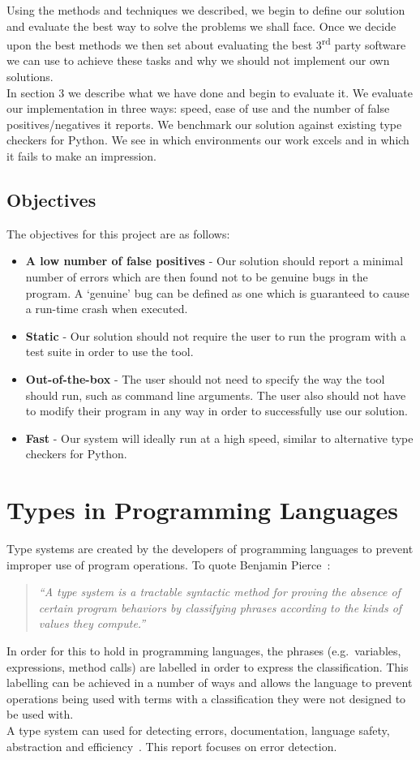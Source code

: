 \documentclass[12pt, titlepage]{article}
\begin{document}
\indent Using the methods and techniques we described, we begin to define our solution and evaluate the best way to solve the problems we shall face. Once we decide upon the best methods we then set about evaluating the best 3\textsuperscript{rd} party software we can use to achieve these tasks and why we should not implement our own solutions. \\
\indent In section 3 we describe what we have done and begin to evaluate it. We evaluate our implementation in three ways: speed, ease of use and the number of false positives/negatives it reports. We benchmark our solution against existing type checkers for Python. We see in which environments our work excels and in which it fails to make an impression.

\subsection{Objectives}
The objectives for this project are as follows:
\begin{itemize}
	\item \textbf{A low number of false positives} - Our solution should report a minimal number of errors which are then found not to be genuine bugs in the program. A `genuine' bug can be defined as one which is guaranteed to cause a run-time crash when executed.
	\item \textbf{Static} - Our solution should not require the user to run the program with a test suite in order to use the tool.
	\item \textbf{Out-of-the-box} - The user should not need to specify the way the tool should run, such as command line arguments. The user also should not have to modify their program in any way in order to successfully use our solution.
	\item \textbf{Fast} - Our system will ideally run at a high speed, similar to alternative type checkers for Python.
\end{itemize} 

\newpage
\section{Types in Programming Languages}
Type systems are created by the developers of programming languages to prevent improper use of program operations. To quote Benjamin Pierce~\cite{pierce02}:
\begin{quote}
	\emph{``A type system is a tractable syntactic method for proving the absence of certain program behaviors by classifying phrases according to the kinds of values they compute.''}
\end{quote}
In order for this to hold in programming languages, the phrases (e.g.\ variables, expressions, method calls) are labelled in order to express the classification. This labelling can be achieved in a number of ways and allows the language to prevent operations being used with terms with a classification they were not designed to be used with. \\
A type system can used for detecting errors, documentation, language safety, abstraction and efficiency~\cite{pierce02}. This report focuses on error detection.
\end{document}
